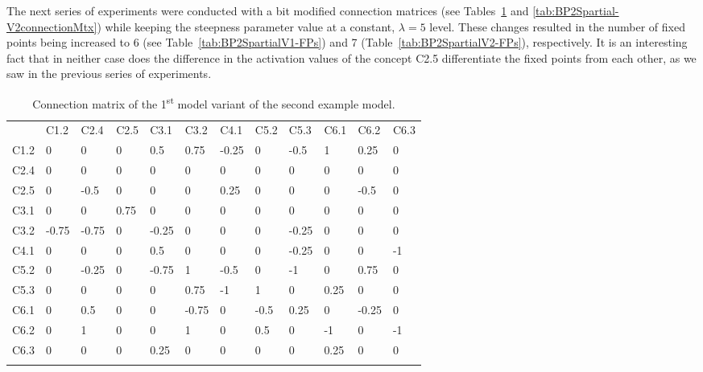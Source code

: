 \documentclass[graybox]{svmult}
\begin{document}
The next series of experiments were conducted with a bit modified connection matrices (see Tables~\ref{tab:BP2Spartial-V1connectionMtx} and \ref{tab:BP2Spartial-V2connectionMtx}) while keeping the steepness parameter value at a constant, $\lambda = 5$ level. These changes resulted in the number of fixed points being increased to 6 (see Table~\ref{tab:BP2SpartialV1-FPs}) and 7 (Table~\ref{tab:BP2SpartialV2-FPs}), respectively. It is an interesting fact that in neither case does the difference in the activation values of the concept C2.5 differentiate the fixed points from each other, as we saw in the previous series of experiments.

\begin{table}
\caption{Connection matrix of the 1\textsuperscript{st} model variant of the second example model.}
\label{tab:BP2Spartial-V1connectionMtx}
\begin{center}
\begin{tabular}{l|lllllllllll}
\hline\noalign{\smallskip}
 & C1.2 & C2.4 & C2.5 & C3.1 & C3.2 & C4.1 & C5.2 & C5.3 & C6.1 & C6.2 & C6.3\\
\noalign{\smallskip}\hline\noalign{\smallskip}
C1.2 & 0 & 0 & 0 & 0.5 & 0.75 & -0.25 & 0 & -0.5 & 1 & 0.25 & 0\\
C2.4 & 0 & 0 & 0 & 0 & 0 & 0 & 0 & 0 & 0 & 0 & 0\\
C2.5 & 0 & -0.5 & 0 & 0 & 0 & 0.25 & 0 & 0 & 0 & -0.5 & 0\\
C3.1 & 0 & 0 & 0.75 & 0 & 0 & 0 & 0 & 0 & 0 & 0 & 0\\
C3.2 & -0.75 & -0.75 & 0 & -0.25 & 0 & 0 & 0 & -0.25 & 0 & 0 & 0\\
C4.1 & 0 & 0 & 0 & 0.5 & 0 & 0 & 0 & -0.25 & 0 & 0 & -1\\
C5.2 & 0 & -0.25 & 0 & -0.75 & 1 & -0.5 & 0 & -1 & 0 & 0.75 & 0\\
C5.3 & 0 & 0 & 0 & 0 & 0.75 & -1 & 1 & 0 & 0.25 & 0 & 0\\
C6.1 & 0 & 0.5 & 0 & 0 & -0.75 & 0 & -0.5 & 0.25 & 0 & -0.25 & 0\\
C6.2 & 0 & 1 & 0 & 0 & 1 & 0 & 0.5 & 0 & -1 & 0 & -1\\
C6.3 & 0 & 0 & 0 & 0.25 & 0 & 0 & 0 & 0 & 0.25 & 0 & 0\\
\noalign{\smallskip}\hline
\end{tabular}
\end{center}
\end{table}
\end{document}
